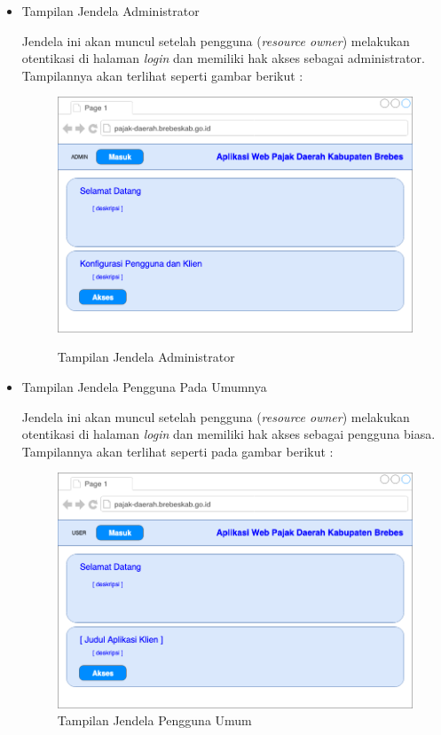 \documentclass[pdftex,12pt, oneside]{article}
\begin{document}
\begin{itemize}
	\item Tampilan Jendela Administrator
	
	Jendela ini akan muncul setelah pengguna (\textit{resource owner}) melakukan otentikasi di halaman \textit{login} dan memiliki hak akses sebagai administrator. Tampilannya akan terlihat seperti gambar berikut :
	
	\begin{figure}[H]
		\centering
		\includegraphics[width=1\textwidth]{./resources/menu-admin-ui}
		\label{fig:menu-admin-ui}
		\caption{Tampilan Jendela Administrator}
	\end{figure}
	
	\item Tampilan Jendela Pengguna Pada Umumnya
	
	Jendela ini akan muncul setelah pengguna (\textit{resource owner}) melakukan otentikasi di halaman \textit{login} dan memiliki hak akses sebagai pengguna biasa. Tampilannya akan terlihat seperti pada gambar berikut :
	
	\begin{figure}[H]
		\centering
		\includegraphics[width=1\textwidth]{./resources/menu-user-ui}
		\caption{Tampilan Jendela Pengguna Umum}
		\label{fig:menu-user-ui}
	\end{figure}
	

\end{itemize}
\end{document}
